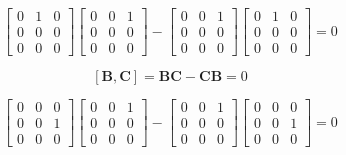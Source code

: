 \documentclass{styles/kaobook}
\begin{document}
$$\begin{bmatrix}{0} & {1} & {0} \\ {0} & {0} & {0} \\ {0} & {0} & {0}\end{bmatrix} \begin{bmatrix}{0} & {0} & {1} \\ {0} & {0} & {0} \\ {0} & {0} & {0}\end{bmatrix}- \begin{bmatrix}{0} & {0} & {1} \\ {0} & {0} & {0} \\ {0} & {0} & {0}\end{bmatrix}\begin{bmatrix}{0} & {1} & {0} \\ {0} & {0} & {0} \\ {0} & {0} & {0}\end{bmatrix} = 0$$

$$[\mathbf{B}, \mathbf{C}] = \mathbf{BC}-\mathbf{C}\mathbf{B} = 0$$

$$\begin{bmatrix}{0} & {0} & {0} \\ {0} & {0} & {1} \\ {0} & {0} & {0}\end{bmatrix}\begin{bmatrix}{0} & {0} & {1} \\ {0} & {0} & {0} \\ {0} & {0} & {0}\end{bmatrix}- \begin{bmatrix}{0} & {0} & {1} \\ {0} & {0} & {0} \\ {0} & {0} & {0}\end{bmatrix}\begin{bmatrix}{0} & {0} & {0} \\ {0} & {0} & {1} \\ {0} & {0} & {0}\end{bmatrix} = 0 $$
\end{document}
